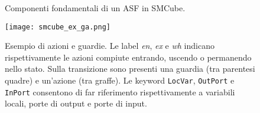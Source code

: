 \begin{figure}
\caption{Componenti fondamentali di un ASF in SMCube.}
\label{Fig:smcube_blocks}
\end{figure}

%
%

\begin{figure}
\centering
\texttt{[image: smcube\_ex\_ga.png]}
\caption{Esempio di azioni e guardie. Le label \textit{en}, \textit{ex} e \textit{wh} indicano rispettivamente le azioni compiute entrando, uscendo o permanendo nello stato. Sulla transizione sono presenti una guardia (tra parentesi quadre) e un'azione (tra graffe). Le keyword \texttt{LocVar}, \texttt{OutPort} e \texttt{InPort} consentono di far riferimento rispettivamente a variabili locali, porte di output e porte di input.}
\label{Fig:smcube_ex_ga}
\end{figure}

